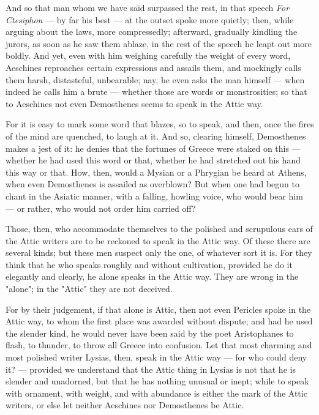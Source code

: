  And so that man whom we have said surpassed the rest, in that speech \textit{For Ctesiphon} — by far his best — at the outset spoke more quietly; then, while arguing about the laws, more compressedly; afterward, gradually kindling the jurors, as soon as he saw them ablaze, in the rest of the speech he leapt out more boldly. And yet, even with him weighing carefully the weight of every word, Aeschines reproaches certain expressions and assails them, and mockingly calls them harsh, distasteful, unbearable; nay, he even asks the man himself — when indeed he calls him a brute — whether those are words or monstrosities; so that to Aeschines not even Demosthenes seems to speak in the Attic way.

 For it is easy to mark some word that blazes, so to speak, and then, once the fires of the mind are quenched, to laugh at it. And so, clearing himself, Demosthenes makes a jest of it: he denies that the fortunes of Greece were staked on this — whether he had used this word or that, whether he had stretched out his hand this way or that. How, then, would a Mysian or a Phrygian be heard at Athens, when even Demosthenes is assailed as overblown? But when one had begun to chant in the Asiatic manner, with a falling, howling voice, who would bear him — or rather, who would not order him carried off?

 Those, then, who accommodate themselves to the polished and scrupulous ears of the Attic writers are to be reckoned to speak in the Attic way. Of these there are several kinds; but these men suspect only the one, of whatever sort it is. For they think that he who speaks roughly and without cultivation, provided he do it elegantly and clearly, he alone speaks in the Attic way. They are wrong in the "alone"; in the "Attic" they are not deceived.

 For by their judgement, if that alone is Attic, then not even Pericles spoke in the Attic way, to whom the first place was awarded without dispute; and had he used the slender kind, he would never have been said by the poet Aristophanes to flash, to thunder, to throw all Greece into confusion. Let that most charming and most polished writer Lysias, then, speak in the Attic way — for who could deny it? — provided we understand that the Attic thing in Lysias is not that he is slender and unadorned, but that he has nothing unusual or inept; while to speak with ornament, with weight, and with abundance is either the mark of the Attic writers, or else let neither Aeschines nor Demosthenes be Attic.

